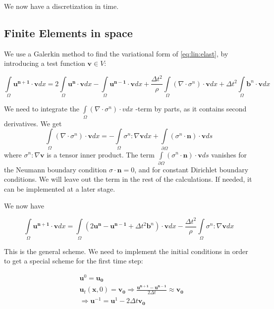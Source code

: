 \documentclass[twoside]{article}
\newcommand{\dtt}{\Delta t^2}
\newcommand{\dt}{\Delta t}
\newcommand{\unp}{\mathbf{u^{n+1}}}
\newcommand{\un}{\mathbf{u^{n}}}
\newcommand{\unm}{\mathbf{u^{n-1}}}
\newcommand{\io}{\int\limits_\Omega}
\begin{document}
We now have a discretization in time.


\subsection{Finite Elements in space}
\label{section:fem}
We use a Galerkin method to find the variational form of \eqref{eq:lin:elast}, by introducing a test function $\mathbf{v} \in V$:

\begin{equation}
\io \unp \cdot \mathbf{v} dx = 2\io \un \cdot \mathbf{v} dx - \io \unm \cdot \mathbf{v} dx + \frac{\dtt}{\rho} \io (\nabla\cdot\sigma^n) \cdot 
\mathbf{v} dx + \dtt \io \mathbf{b}^n \cdot \mathbf{v} dx
\end{equation}

We need to integrate the $\io (\nabla\cdot\sigma^n) \cdot v dx$ -term by parts, as it contains second derivatives. We get
\begin{equation}
\io (\nabla\cdot\sigma^n) \cdot \mathbf{v} dx = - \io \sigma^n : \nabla \mathbf{v} dx + \int\limits_{\partial\Omega} (\sigma^n\cdot \mathbf{n})\cdot \mathbf{v} ds
\end{equation}
where $\sigma^n : \nabla \mathbf{v}$ is a tensor inner product. The term  $\int\limits_{\partial\Omega} (\sigma^n\cdot \mathbf{n})\cdot \mathbf{v} ds$ vanishes for the Neumann boundary condition $\sigma\cdot\mathbf{n} = 0$, and for constant Dirichlet boundary conditions. We will leave out the term in the rest of the calculations. If needed, it can be implemented at a later stage.

We now have

\begin{equation}
\io \unp \cdot \mathbf{v} dx = \io (2\un - \unm  + \dtt \mathbf{b}^n) \cdot \mathbf{v} dx - \frac{\dtt}{\rho} \io \sigma^n : \nabla \mathbf{v} dx 
\label{gen:scheme}
\end{equation}

This is the general scheme. We need to implement the initial conditions in order to get a special scheme for the first time step:

\begin{align}
&\mathbf{u}^0 = \mathbf{u_0} \nonumber\\
&\mathbf{u}_t(\mathbf{x},0) = \mathbf{v_0} \Rightarrow \frac{\unp - \unm}{2\dt}\approx \mathbf{v_0}\nonumber\\
&\Rightarrow \mathbf{u}^{-1} = \mathbf{u}^{1} - 2\dt \mathbf{v_0}\nonumber
\end{align}
\end{document}
